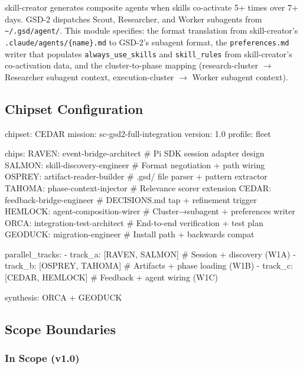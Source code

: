 \documentclass[11pt,letterpaper]{article}
\begin{document}
skill-creator generates composite agents when skills co-activate 5+ times over 7+ days. GSD-2 dispatches Scout, Researcher, and Worker subagents from \texttt{\textasciitilde/.gsd/agent/}. This module specifies: the format translation from skill-creator's \texttt{.claude/agents/\{name\}.md} to GSD-2's subagent format, the \texttt{preferences.md} writer that populates \texttt{always\_use\_skills} and \texttt{skill\_rules} from skill-creator's co-activation data, and the cluster-to-phase mapping (research-cluster $\to$ Researcher subagent context, execution-cluster $\to$ Worker subagent context).

\subsection{Chipset Configuration}

\begin{asciibox}
chipset: CEDAR
mission: sc-gsd2-full-integration
version: 1.0
profile: fleet

chips:
  RAVEN:   event-bridge-architect       # Pi SDK session adapter design
  SALMON:  skill-discovery-engineer     # Format negotiation + path wiring
  OSPREY:  artifact-reader-builder      # .gsd/ file parser + pattern extractor
  TAHOMA:  phase-context-injector       # Relevance scorer extension
  CEDAR:   feedback-bridge-engineer     # DECISIONS.md tap + refinement trigger
  HEMLOCK: agent-composition-wirer      # Cluster→subagent + preferences writer
  ORCA:    integration-test-architect   # End-to-end verification + test plan
  GEODUCK: migration-engineer           # Install path + backwards compat

parallel_tracks:
  - track_a: [RAVEN, SALMON]      # Session + discovery (W1A)
  - track_b: [OSPREY, TAHOMA]     # Artifacts + phase loading (W1B)
  - track_c: [CEDAR, HEMLOCK]     # Feedback + agent wiring (W1C)

synthesis: ORCA + GEODUCK
\end{asciibox}

\subsection{Scope Boundaries}

\subsubsection{In Scope (v1.0)}
\end{document}
